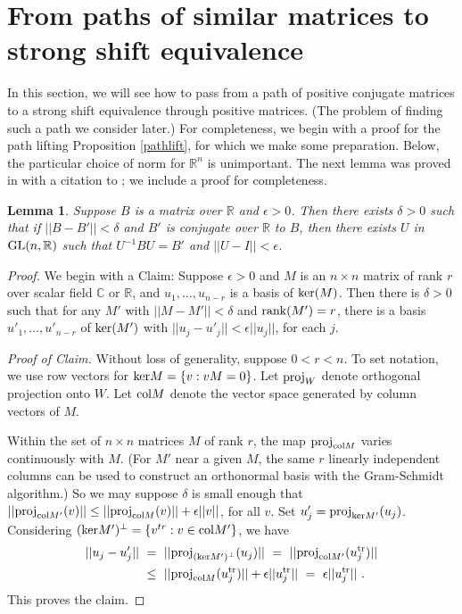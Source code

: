 \documentclass{amsart}
\newtheorem{lemma}[theorem]{Lemma}
\theoremstyle{definition}
\theoremstyle{remark}
\newcommand{\tr}{\textnormal{tr}}
\numberwithin{equation}{section}
\begin{document}
{{\section{From paths of similar matrices to strong shift equivalence}
\label{frompathssec}

In this section, we will see how to pass from a path of positive conjugate 
matrices to a strong shift equivalence through positive matrices.   
(The problem of finding such a path we consider later.) 
For completeness, we begin with  a proof for the path lifting 
Proposition \ref{pathlift}, for which we make some preparation. 
Below, the particular choice of norm for $\mathbb R^n$ is 
unimportant. The next lemma was proved in \cite{KR3} with a 
citation to \cite{GR}; we include a proof for completeness. 

\begin{lemma} 
\label{closeconjugation}
Suppose $B$ is a matrix over $\mathbb R$ 
and $\epsilon > 0$. 
Then there exists $\delta >0 $ such that 
if  $||B-B'||<\delta$ and 
$B'$ is conjugate over $\mathbb R$ to $B$, 
then there exists $U$ in $\textnormal{GL}(n,\mathbb R)$ such that 
$U^{-1}BU = B'$ and $||U-I||<\epsilon$. 
\end{lemma} 

\begin{proof} 
We begin with a Claim: 
Suppose $\epsilon > 0$ and $M$ is an $n\times n$ matrix 
of rank $r$ over scalar field $\mathbb C$ or $\mathbb R$, 
and $u_1, \dots , u_{n-r}$ is a basis of $\textnormal{ker}(M)$. 
Then there is $\delta> 0$ such that for any $M'$ with 
$||M-M'||<\delta $ and 
$\textnormal{rank}(M')=r$, there is a basis 
$u'_1, \dots , u'_{n-r}$ of $\textnormal{ker}(M')$ with 
$||u_j-u'_j||<\epsilon ||u_j||$, for each $j$. 

{\it Proof of Claim.} Without loss of generality, suppose 
$0<r<n$. To set notation, we use row vectors
for  $\textnormal{ker}M=\{v:vM=0\}$. 
Let $\textnormal{proj}_W$ denote orthogonal projection onto $W$. Let 
$\textnormal{col} M$ denote the vector space generated by column 
vectors of $M$. 

Within the set of $n\times n$ matrices $M$ of rank $r$, 
the map $\textnormal{proj}_{\textnormal{col}M}$ varies continuously with 
$M$. (For $M'$ near a given $M$, the same $r$ linearly independent 
columns can be used to construct an orthonormal basis with the 
Gram-Schmidt algorithm.) So we may suppose $\delta$ is small enough 
that $||\textnormal{proj}_{\textnormal{col}M'}(v)||
\leq  ||\textnormal{proj}_{\textnormal{col}M}(v)|| + \epsilon ||v||$, for all $v$. 
Set $u'_j= \textnormal{proj}_{\textnormal{ker}M'}(u_j)$. Considering 
$(\textnormal{ker}M')^{\perp}=\{v^{tr}:v\in \textnormal{col}M'\}$, we have 
\begin{align*} 
||u_j-u'_j||\  &  =\  ||\textnormal{proj}_{(\textnormal{ker}M')^{\perp}}(u_j) || \ 
= \ ||\textnormal{proj}_{\textnormal{col}M'}(u^{\tr}_j)|| \\
&  \leq \ 
 ||\textnormal{proj}_{\textnormal{col}M}(u^{\tr}_j)||+ 
\epsilon  ||u^{\tr}_j|| \ 
= \  \epsilon  ||u^{\tr}_j|| \ . 
\end{align*} 
This proves the claim. 


\end{proof}}}
\end{document}
